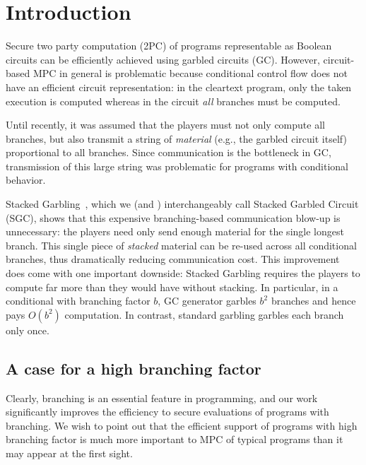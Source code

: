 \section{Introduction}\label{sec:intro}

Secure two party computation (2PC) of programs representable as Boolean circuits can be efficiently achieved using garbled circuits (GC).
%
However,  circuit-based MPC in general is problematic because conditional
control flow does not have an efficient circuit representation:
in the cleartext program, only the taken execution is computed whereas in
the circuit \emph{all} branches must be computed.

%
Until recently, it was assumed that the players must not only compute
all branches, but also transmit a string of \emph{material} (e.g., the garbled circuit itself) 
proportional to all branches.  
Since communication is the bottleneck in GC, transmission of this large string was
problematic for programs with conditional behavior.

Stacked Garbling~\HK, which we (and \HK)  interchangeably call Stacked Garbled Circuit (SGC), shows that
this expensive branching-based communication blow-up is unnecessary: the players need only
send enough material for the single longest branch. This single
piece of \emph{stacked} material can be re-used across all conditional branches, thus
dramatically reducing communication cost.
%
This improvement does come with one important downside:
Stacked Garbling requires the players to compute far more than they
would have without stacking.
In particular, in a conditional with branching factor $b$, \HK GC generator garbles $b^2$ branches and hence pays $O(b^2)$ computation.  In contrast, standard garbling garbles each branch only once.


\subsection{A case for a high branching factor}
\label{sec:motivationHighB}

Clearly,   branching is an essential feature in programming, and our work significantly improves the efficiency to secure evaluations of programs with branching.
We wish to point out that the efficient support of programs with high branching factor is much more important to MPC of typical programs than it may appear at the first sight.  

